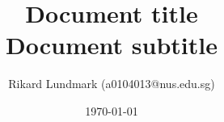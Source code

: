 \title{{\bf Document title} \\
Document subtitle}
\author{
Rikard Lundmark (a0104013@nus.edu.sg)\\
}
\date{\today}
\maketitle

\begin{abstract}

\end{abstract}

\tableofcontents
\clearpage
